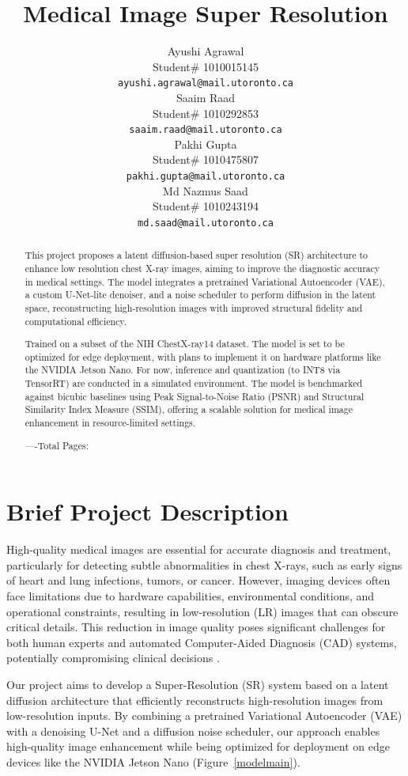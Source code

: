 \documentclass{article} %
\title{Medical Image Super Resolution}
\author{Ayushi Agrawal  \\
Student\# 1010015145\\
\texttt{ayushi.agrawal@mail.utoronto.ca} \\
\And
Saaim Raad  \\
Student\# 1010292853 \\
\texttt{saaim.raad@mail.utoronto.ca} \\
\And
Pakhi Gupta  \\
Student\# 1010475807 \\
\texttt{pakhi.gupta@mail.utoronto.ca} \\
\And
Md Nazmus Saad\\
Student\# 1010243194 \\
\texttt{md.saad@mail.utoronto.ca} \\
}
\begin{document}
\maketitle

\begin{abstract}
This project proposes a latent diffusion-based super resolution (SR) architecture to enhance low resolution chest X-ray images, aiming to improve the diagnostic accuracy in medical settings. The model integrates a pretrained Variational Autoencoder (VAE), a custom U-Net-lite denoiser, and a noise scheduler to perform diffusion in the latent space, reconstructing high-resolution images with improved structural fidelity and computational efficiency.

Trained on a subset of the NIH ChestX-ray14 dataset. The model is set to be optimized for edge deployment, with plans to implement it on hardware platforms like the NVIDIA Jetson Nano. For now, inference and quantization (to INT8 via TensorRT) are conducted in a simulated environment. The model is benchmarked against bicubic baselines using Peak Signal-to-Noise Ratio (PSNR) and Structural Similarity Index Measure (SSIM), offering a scalable solution for medical image enhancement in resource-limited settings.

----Total Pages: \pageref{last_page}
\end{abstract}



\section{Brief Project Description}

High-quality medical images are essential for accurate diagnosis and treatment, particularly for detecting subtle abnormalities in chest X-rays, such as early signs of heart and lung infections, tumors, or cancer. However, imaging devices often face limitations due to hardware capabilities, environmental conditions, and operational constraints, resulting in low-resolution (LR) images that can obscure critical details. This reduction in image quality poses significant challenges for both human experts and automated Computer-Aided Diagnosis (CAD) systems, potentially compromising clinical decisions \citep{Sabina23}.

Our project aims to develop a Super-Resolution (SR) system based on a latent diffusion architecture that efficiently reconstructs high-resolution images from low-resolution inputs. By combining a pretrained Variational Autoencoder (VAE) with a denoising U-Net and a diffusion noise scheduler, our approach enables high-quality image enhancement while being optimized for deployment on edge devices like the NVIDIA Jetson Nano (Figure~\ref{modelmain}).
\end{document}
